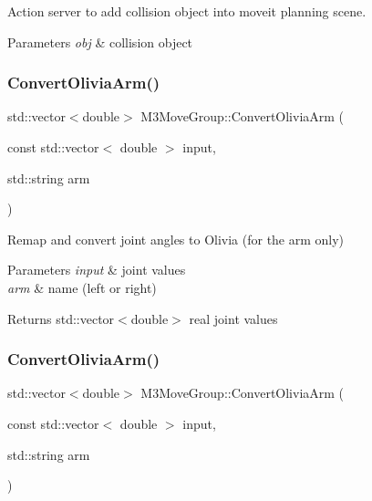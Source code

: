 Action server to add collision object into moveit planning scene. 


\begin{DoxyParams}{Parameters}
{\em obj} & collision object \\
\hline
\end{DoxyParams}
\mbox{\label{classM3MoveGroup_a422eebf405bc0b3187bb6e692b361fa0}} 
\subsubsection{\texorpdfstring{Convert\+Olivia\+Arm()}{ConvertOliviaArm()}\hspace{0.1cm}{\footnotesize\ttfamily [1/2]}}
{\footnotesize\ttfamily std\+::vector$<$double$>$ M3\+Move\+Group\+::\+Convert\+Olivia\+Arm (\begin{DoxyParamCaption}\item[{const std\+::vector$<$ double $>$}]{input,  }\item[{std\+::string}]{arm }\end{DoxyParamCaption})\hspace{0.3cm}{\ttfamily [inline]}}



Remap and convert joint angles to Olivia (for the arm only) 


\begin{DoxyParams}{Parameters}
{\em input} & joint values \\
\hline
{\em arm} & name (left or right) \\
\hline
\end{DoxyParams}
\begin{DoxyReturn}{Returns}
std\+::vector$<$double$>$ real joint values 
\end{DoxyReturn}
\mbox{\label{classM3MoveGroup_a422eebf405bc0b3187bb6e692b361fa0}} 
\subsubsection{\texorpdfstring{Convert\+Olivia\+Arm()}{ConvertOliviaArm()}\hspace{0.1cm}{\footnotesize\ttfamily [2/2]}}
{\footnotesize\ttfamily std\+::vector$<$double$>$ M3\+Move\+Group\+::\+Convert\+Olivia\+Arm (\begin{DoxyParamCaption}\item[{const std\+::vector$<$ double $>$}]{input,  }\item[{std\+::string}]{arm }\end{DoxyParamCaption})\hspace{0.3cm}{\ttfamily [inline]}}



